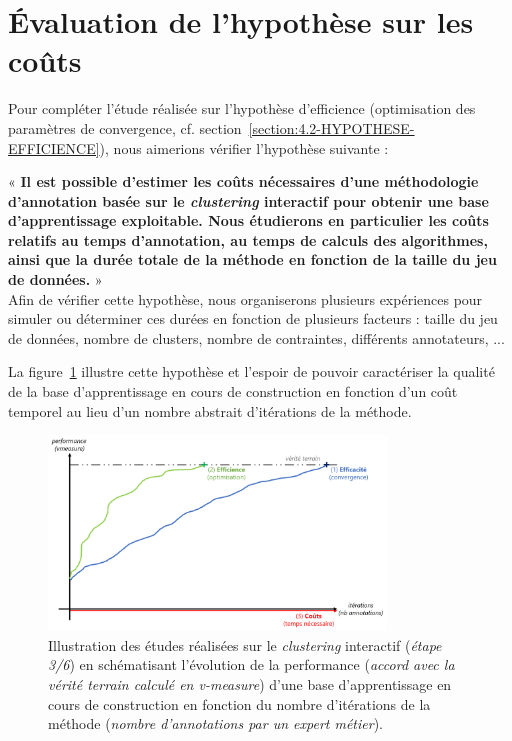 \section{Évaluation de l'hypothèse sur les coûts}
\label{section:4.3-HYPOTHESE-COUTS}

	Pour compléter l'étude réalisée sur l'hypothèse d'efficience (optimisation des paramètres de convergence, cf. section~\ref{section:4.2-HYPOTHESE-EFFICIENCE}), nous aimerions vérifier l'hypothèse suivante :

	\begin{tcolorbox}[
		title=\faVial~\textbf{Hypothèse sur les coûts}~\faVial,
		colback=colorTcolorboxHypothesis!15,
		colframe=colorTcolorboxHypothesis!75,
		width=\linewidth
	]
		«\textbf{
			Il est possible d'\textbf{estimer les coûts nécessaires} d'une méthodologie d'annotation basée sur le \textit{clustering} interactif pour obtenir une base d'apprentissage exploitable. Nous étudierons en particulier les coûts relatifs au temps d'annotation, au temps de calculs des algorithmes, ainsi que la durée totale de la méthode en fonction de la taille du jeu de données.
		} » \\

		Afin de vérifier cette hypothèse, nous organiserons plusieurs expériences pour simuler ou déterminer ces durées en fonction de plusieurs facteurs : taille du jeu de données, nombre de clusters, nombre de contraintes, différents annotateurs, ...
		
		La figure~\ref{figure:4.3-HYPOTHESE-COUTS} illustre cette hypothèse et l'espoir de pouvoir caractériser la qualité de la base d'apprentissage en cours de construction en fonction d'un coût temporel au lieu d'un nombre abstrait d'itérations de la méthode. 
		
		\begin{figure}[H]  %
			\centering
			\includegraphics[width=0.8\textwidth]{figures/hypotheses-03-couts}
			\caption{Illustration des études réalisées sur le \textit{clustering} interactif (\textit{étape 3/6}) en schématisant l'évolution de la performance (\textit{accord avec la vérité terrain calculé en v-measure}) d'une base d'apprentissage en cours de construction en fonction du nombre d'itérations de la méthode (\textit{nombre d'annotations par un expert métier}).}
			\label{figure:4.3-HYPOTHESE-COUTS}
		\end{figure}

	\end{tcolorbox}
	

